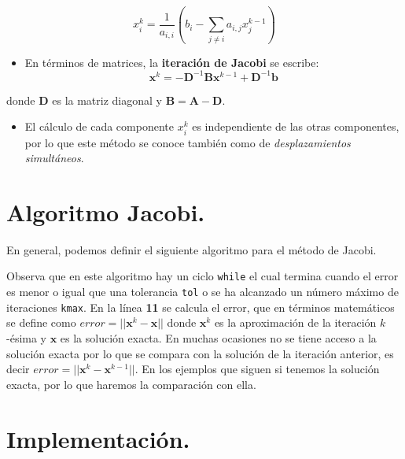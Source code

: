 \documentclass[
  letterpaper,
  DIV=11,
  numbers=noendperiod]{scrreprt}
\providecommand{\tightlist}{%
  \setlength{\itemsep}{0pt}\setlength{\parskip}{0pt}}\usepackage{longtable,booktabs,array}
\begin{document}
\[
x_i^k = \frac{1}{a_{i,i}} \left(b_i -  \sum_{j \neq i} a_{i,j} x_j^{k-1} \right)
\]

\begin{itemize}
\tightlist
\item
  En términos de matrices, la \textbf{iteración de Jacobi} se escribe:
  \[
  \mathbf{x}^k = -\mathbf{D}^{-1} \mathbf{B}\mathbf{x}^{k-1} + \mathbf{D}^{-1} \mathbf{b}
  \]
\end{itemize}

donde \(\mathbf{D}\) es la matriz diagonal y
\(\mathbf{B} = \mathbf{A} - \mathbf{D}\).

\begin{itemize}
\tightlist
\item
  El cálculo de cada componente \(x_i^k\) es independiente de las otras
  componentes, por lo que este método se conoce también como de
  \emph{desplazamientos simultáneos}.
\end{itemize}

\section{Algoritmo Jacobi.}\label{algoritmo-jacobi.}

En general, podemos definir el siguiente algoritmo para el método de
Jacobi.

Observa que en este algoritmo hay un ciclo \texttt{while} el cual
termina cuando el error es menor o igual que una tolerancia \texttt{tol}
o se ha alcanzado un número máximo de iteraciones \texttt{kmax}. En la
línea \textbf{11} se calcula el error, que en términos matemáticos se
define como \(error = || \mathbf{x}^k - \mathbf{x}||\) donde
\(\mathbf{x}^k\) es la aproximación de la iteración \(k\)-ésima y
\(\mathbf{x}\) es la solución exacta. En muchas ocasiones no se tiene
acceso a la solución exacta por lo que se compara con la solución de la
iteración anterior, es decir
\(error = || \mathbf{x}^k - \mathbf{x}^{k-1}||\). En los ejemplos que
siguen si tenemos la solución exacta, por lo que haremos la comparación
con ella.

\section{Implementación.}\label{implementaciuxf3n.}
\end{document}
